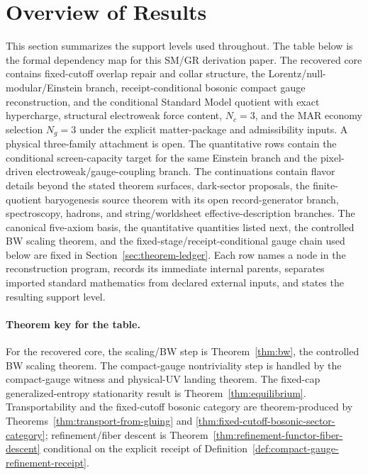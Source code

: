 \documentclass[11pt]{article}
\begin{document}
\section{Overview of Results}

This section summarizes the support levels used throughout. The table below is the formal dependency
map for this SM/GR derivation paper. The recovered core contains fixed-cutoff overlap repair and
collar structure, the Lorentz/null-modular/Einstein branch, receipt-conditional bosonic compact gauge reconstruction,
and the conditional Standard Model quotient with exact hypercharge, structural electroweak force content, \(N_c=3\), and the MAR economy selection \(N_g=3\)
under the explicit matter-package and admissibility inputs. A physical three-family attachment is open. The quantitative rows contain the
conditional screen-capacity target for the same Einstein branch and the pixel-driven electroweak/gauge-coupling
branch. The continuations contain flavor details beyond the stated theorem surfaces, dark-sector
proposals, the finite-quotient baryogenesis source theorem with its open record-generator branch, spectroscopy, hadrons, and string/worldsheet
effective-description branches. The canonical five-axiom basis, the quantitative quantities listed
next, the controlled BW scaling theorem, and the fixed-stage/receipt-conditional gauge chain used below are
fixed in Section~\ref{sec:theorem-ledger}. Each row names a node in the reconstruction program,
records its immediate internal parents, separates imported standard mathematics from declared
external inputs, and states the resulting support level.

\paragraph{Theorem key for the table.}
For the recovered core, the scaling/BW step is Theorem~\ref{thm:bw}, the controlled BW scaling theorem. The compact-gauge nontriviality step is handled by the compact-gauge witness and physical-UV landing theorem. The fixed-cap generalized-entropy stationarity result is Theorem~\ref{thm:equilibrium}. Transportability and the fixed-cutoff bosonic category are theorem-produced by Theorems~\ref{thm:transport-from-gluing} and \ref{thm:fixed-cutoff-bosonic-sector-category}; refinement/fiber descent is Theorem~\ref{thm:refinement-functor-fiber-descent} conditional on the explicit receipt of Definition~\ref{def:compact-gauge-refinement-receipt}.
\end{document}
